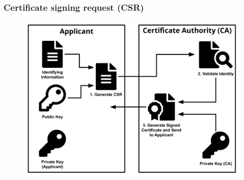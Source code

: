 \documentclass[11pt]{article}
\begin{document}
\subsubsection{Certificate signing request (CSR)}

\begin{figure}[!ht]
  \includegraphics[width=.98\textwidth]{pic5-hw6-7-1635747}
  \label{fig:CA sign certificate}
\end{figure}
\end{document}
